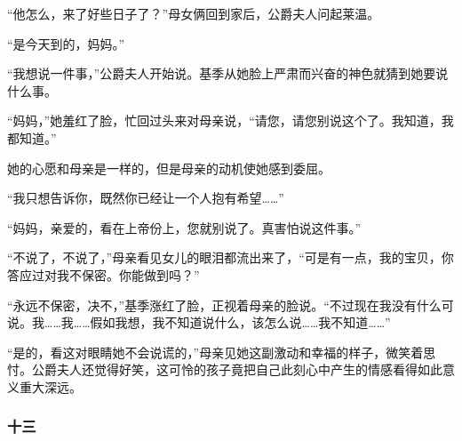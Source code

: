 \par “他怎么，来了好些日子了？”母女俩回到家后，公爵夫人问起莱温。
\par “是今天到的，妈妈。”
\par “我想说一件事，”公爵夫人开始说。基季从她脸上严肃而兴奋的神色就猜到她要说什么事。
\par “妈妈，”她羞红了脸，忙回过头来对母亲说，“请您，请您别说这个了。我知道，我都知道。”
\par 她的心愿和母亲是一样的，但是母亲的动机使她感到委屈。
\par “我只想告诉你，既然你已经让一个人抱有希望……”
\par “妈妈，亲爱的，看在上帝份上，您就别说了。真害怕说这件事。”
\par “不说了，不说了，”母亲看见女儿的眼泪都流出来了，“可是有一点，我的宝贝，你答应过对我不保密。你能做到吗？”
\par “永远不保密，决不，”基季涨红了脸，正视着母亲的脸说。“不过现在我没有什么可说。我……我……假如我想，我不知道说什么，该怎么说……我不知道……”
\par “是的，看这对眼睛她不会说谎的，”母亲见她这副激动和幸福的样子，微笑着思忖。公爵夫人还觉得好笑，这可怜的孩子竟把自己此刻心中产生的情感看得如此意义重大深远。


\subsubsection*{十三}

